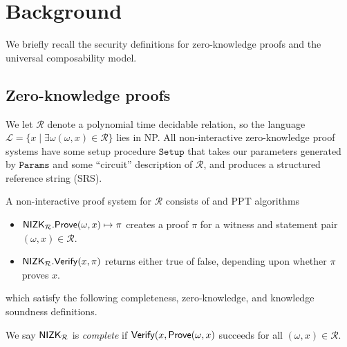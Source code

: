 

\section{Background}
\label{sec:background}

We briefly recall the security definitions for zero-knowledge proofs and the universal composability model.


\subsection{Zero-knowledge proofs}

\newcommand\rel{\ensuremath{\mathcal{R}}\xspace}
\newcommand\lang{\ensuremath{\mathcal{L}}\xspace}

% 

We let \rel denote a polynomial time decidable relation, so the language
$\lang = \{x \mid \exists \omega (\omega,x) \in \rel \}$ lies in NP.
All non-interactive zero-knowledge proof systems have some setup procedure $\mathtt{Setup}$ that takes our parameters generated by $\mathtt{Params}$ and some ``circuit'' description of \rel, and produces a structured reference string (SRS).

A non-interactive proof system for $\rel$ consists of \Prove and \Verify PPT algorithms
\begin{itemize}
	\item $\NIZK_\rel.\Prove(\omega, x) \mapsto \pi$ creates a proof $\pi$ for a witness and statement pair $(\omega,x) \in \rel$.
	\item $\NIZK_\rel.\Verify(x, \pi)$ returns either true of false, depending upon whether $\pi$  proves $x$.
\end{itemize}	
which satisfy the following completeness, zero-knowledge, and knowledge soundness definitions.

\begin{definition}\label{def:nizk_completeness}
	We say $\NIZK_\rel$ is {\em complete} if ${\mathsf{Verify}}(x, {\mathsf{Prove}}(\omega,x)$ succeeds for all $(\omega,x) \in \rel$.  %
\end{definition}

